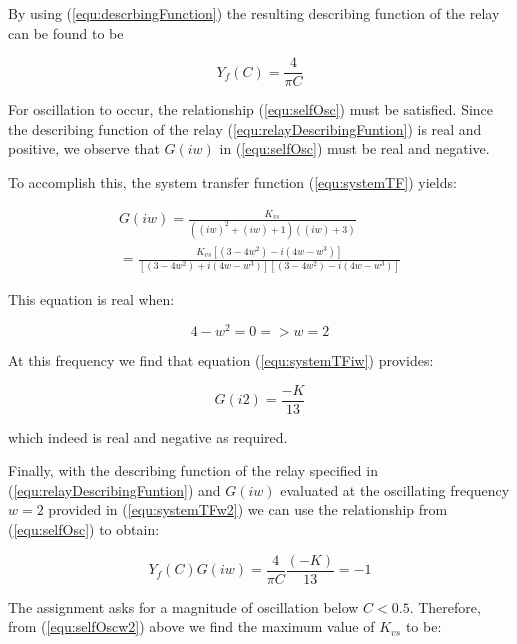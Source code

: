 \documentclass[a4paper, titlepage]{article}
\begin{document}
By using (\ref{equ:descrbingFunction}) the resulting describing function of the relay can be found to be \citep[P. 359]{glad00}

\begin{equation}
Y_{f}(C) = \frac{4}{\pi C}
\label{equ:relayDescribingFuntion}
\end{equation}

For oscillation to occur, the relationship (\ref{equ:selfOsc}) must be satisfied.  Since the describing function of the relay (\ref{equ:relayDescribingFuntion}) is real and positive, we observe that $G(iw)$ in (\ref{equ:selfOsc}) must be real and negative.

To accomplish this, the system transfer function (\ref{equ:systemTF}) yields:

\begin{equation}
\begin{split}
G(iw) = \frac{K_{vs}}{((iw)^2+(iw)+1)((iw)+3)}\\
= \frac{K_{vs}[(3-4w^2)-i(4w-w^3)]}{[(3-4w^2)+i(4w-w^3)][(3-4w^2)-i(4w-w^3)]}
\end{split}
\label{equ:systemTFiw}
\end{equation}

This equation is real when:

\begin{equation}
4-w^2 = 0 => w=2
\label{equ:systemTFreal}
\end{equation}

At this frequency we find that equation (\ref{equ:systemTFiw}) provides:

\begin{equation}
G(i2) = \frac{-K}{13}
\label{equ:systemTFw2}
\end{equation}

which indeed is real and negative as required.

Finally, with the describing function of the relay specified in  (\ref{equ:relayDescribingFuntion}) and $G(iw)$ evaluated at the oscillating frequency $w=2$ provided in (\ref{equ:systemTFw2}) we can use the relationship from (\ref{equ:selfOsc}) to obtain:

\begin{equation}
Y_{f}(C)G(iw) = \frac{4}{\pi C}\frac{(-K)}{13} = -1
\label{equ:selfOscw2}
\end{equation}

The assignment asks for a magnitude of oscillation below $C < 0.5$.
Therefore, from (\ref{equ:selfOscw2}) above we find the maximum value of $K_{vs}$ to be:
\end{document}
